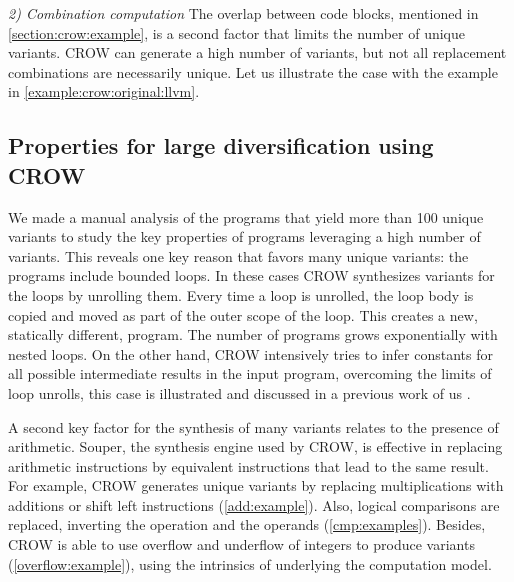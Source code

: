 
\emph{2) Combination computation}  The overlap between code blocks, mentioned in \autoref{section:crow:example}, is a second factor that limits the number of unique variants. CROW can generate a high number of variants, but not all replacement combinations are necessarily unique. Let us illustrate the case with the example in \autoref{example:crow:original:llvm}.



\subsection{Properties for large diversification using CROW}

We made a manual analysis of the programs that yield more than 100 unique variants to study the key properties of programs leveraging a high number of variants.
This reveals one key reason that favors many unique variants: the programs include  bounded loops. In these cases CROW
synthesizes variants for the loops by unrolling them. Every time a loop is unrolled, the loop body is copied and moved as part of the outer scope of the loop. This creates a new, statically different, program. The number of programs grows exponentially with nested loops. On the other hand, CROW intensively tries to infer constants for all possible intermediate results in the input program, overcoming the limits of loop unrolls, this case is illustrated and discussed in a previous work of us .

A second key factor for the synthesis of many variants relates to the presence of arithmetic. Souper, the synthesis engine used by CROW, is effective in replacing  arithmetic instructions by equivalent instructions that lead to the same result. For example, CROW generates unique variants by replacing multiplications with additions or shift left instructions (\autoref{add:example}). Also, logical comparisons are replaced, inverting the operation and the operands (\autoref{cmp:examples}). Besides, CROW is able to use overflow and underflow of integers to produce variants (\autoref{overflow:example}), using the intrinsics of underlying the computation model.

